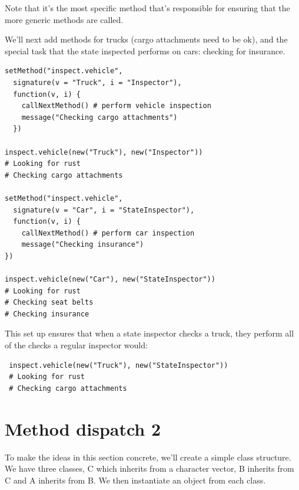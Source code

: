 Note that it's the most specific method that's responsible for ensuring
that the more generic methods are called.

We'll next add methods for trucks (cargo attachments need to be ok), and
the special task that the state inspected performs on cars: checking for
insurance.

\begin{verbatim}
setMethod("inspect.vehicle", 
  signature(v = "Truck", i = "Inspector"),
  function(v, i) {
    callNextMethod() # perform vehicle inspection
    message("Checking cargo attachments")
  })

inspect.vehicle(new("Truck"), new("Inspector"))
# Looking for rust
# Checking cargo attachments

setMethod("inspect.vehicle", 
  signature(v = "Car", i = "StateInspector"),
  function(v, i) {
    callNextMethod() # perform car inspection
    message("Checking insurance")
})

inspect.vehicle(new("Car"), new("StateInspector"))
# Looking for rust
# Checking seat belts
# Checking insurance
\end{verbatim}

This set up ensures that when a state inspector checks a truck, they
perform all of the checks a regular inspector would:

\begin{verbatim}
 inspect.vehicle(new("Truck"), new("StateInspector"))
 # Looking for rust
 # Checking cargo attachments
\end{verbatim}

\section{Method dispatch 2}

To make the ideas in this section concrete, we'll create a simple class
structure. We have three classes, C which inherits from a character
vector, B inherits from C and A inherits from B. We then instantiate an
object from each class.

\begin{Shaded}
\begin{Highlighting}[]
\NormalTok{(}\NormalTok{, } \NormalTok{)}
\NormalTok{(}\NormalTok{, } \NormalTok{)}
\NormalTok{(}\NormalTok{, } \NormalTok{)}

\StringTok{ }\NormalTok{(}\NormalTok{, }\NormalTok{)}
\StringTok{ }\NormalTok{(}\NormalTok{, }\NormalTok{)}
\StringTok{ }\NormalTok{(}\NormalTok{, }\NormalTok{)}
\end{Highlighting}
\end{Shaded}

